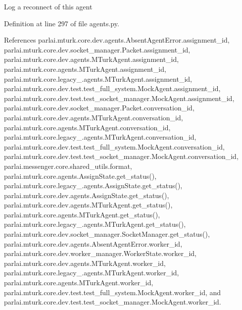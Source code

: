 \begin{DoxyVerb}Log a reconnect of this agent \end{DoxyVerb}
 

Definition at line 297 of file agents.\+py.



References parlai.\+mturk.\+core.\+dev.\+agents.\+Absent\+Agent\+Error.\+assignment\+\_\+id, parlai.\+mturk.\+core.\+dev.\+socket\+\_\+manager.\+Packet.\+assignment\+\_\+id, parlai.\+mturk.\+core.\+dev.\+agents.\+M\+Turk\+Agent.\+assignment\+\_\+id, parlai.\+mturk.\+core.\+agents.\+M\+Turk\+Agent.\+assignment\+\_\+id, parlai.\+mturk.\+core.\+legacy\+\_.\+agents.\+M\+Turk\+Agent.\+assignment\+\_\+id, parlai.\+mturk.\+core.\+dev.\+test.\+test\+\_\+full\+\_\+system.\+Mock\+Agent.\+assignment\+\_\+id, parlai.\+mturk.\+core.\+dev.\+test.\+test\+\_\+socket\+\_\+manager.\+Mock\+Agent.\+assignment\+\_\+id, parlai.\+mturk.\+core.\+dev.\+socket\+\_\+manager.\+Packet.\+conversation\+\_\+id, parlai.\+mturk.\+core.\+dev.\+agents.\+M\+Turk\+Agent.\+conversation\+\_\+id, parlai.\+mturk.\+core.\+agents.\+M\+Turk\+Agent.\+conversation\+\_\+id, parlai.\+mturk.\+core.\+legacy\+\_.\+agents.\+M\+Turk\+Agent.\+conversation\+\_\+id, parlai.\+mturk.\+core.\+dev.\+test.\+test\+\_\+full\+\_\+system.\+Mock\+Agent.\+conversation\+\_\+id, parlai.\+mturk.\+core.\+dev.\+test.\+test\+\_\+socket\+\_\+manager.\+Mock\+Agent.\+conversation\+\_\+id, parlai.\+messenger.\+core.\+shared\+\_\+utils.\+format, parlai.\+mturk.\+core.\+agents.\+Assign\+State.\+get\+\_\+status(), parlai.\+mturk.\+core.\+legacy\+\_.\+agents.\+Assign\+State.\+get\+\_\+status(), parlai.\+mturk.\+core.\+dev.\+agents.\+Assign\+State.\+get\+\_\+status(), parlai.\+mturk.\+core.\+dev.\+agents.\+M\+Turk\+Agent.\+get\+\_\+status(), parlai.\+mturk.\+core.\+agents.\+M\+Turk\+Agent.\+get\+\_\+status(), parlai.\+mturk.\+core.\+legacy\+\_.\+agents.\+M\+Turk\+Agent.\+get\+\_\+status(), parlai.\+mturk.\+core.\+dev.\+socket\+\_\+manager.\+Socket\+Manager.\+get\+\_\+status(), parlai.\+mturk.\+core.\+dev.\+agents.\+Absent\+Agent\+Error.\+worker\+\_\+id, parlai.\+mturk.\+core.\+dev.\+worker\+\_\+manager.\+Worker\+State.\+worker\+\_\+id, parlai.\+mturk.\+core.\+dev.\+agents.\+M\+Turk\+Agent.\+worker\+\_\+id, parlai.\+mturk.\+core.\+legacy\+\_.\+agents.\+M\+Turk\+Agent.\+worker\+\_\+id, parlai.\+mturk.\+core.\+agents.\+M\+Turk\+Agent.\+worker\+\_\+id, parlai.\+mturk.\+core.\+dev.\+test.\+test\+\_\+full\+\_\+system.\+Mock\+Agent.\+worker\+\_\+id, and parlai.\+mturk.\+core.\+dev.\+test.\+test\+\_\+socket\+\_\+manager.\+Mock\+Agent.\+worker\+\_\+id.

